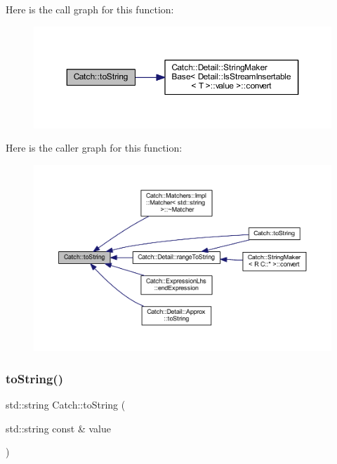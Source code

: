 Here is the call graph for this function\+:\nopagebreak
\begin{figure}[H]
\begin{center}
\leavevmode
\includegraphics[width=350pt]{namespace_catch_adbd1730f961da94d9ed284f70fd7a28b_cgraph}
\end{center}
\end{figure}
Here is the caller graph for this function\+:\nopagebreak
\begin{figure}[H]
\begin{center}
\leavevmode
\includegraphics[width=350pt]{namespace_catch_adbd1730f961da94d9ed284f70fd7a28b_icgraph}
\end{center}
\end{figure}
\hypertarget{namespace_catch_ad6e969257437cf007b8b5017b22e570c}{}\label{namespace_catch_ad6e969257437cf007b8b5017b22e570c} 
\subsubsection{\texorpdfstring{to\+String()}{toString()}\hspace{0.1cm}{\footnotesize\ttfamily [2/17]}}
{\footnotesize\ttfamily std\+::string Catch\+::to\+String (\begin{DoxyParamCaption}\item[{std\+::string const \&}]{value }\end{DoxyParamCaption})}

